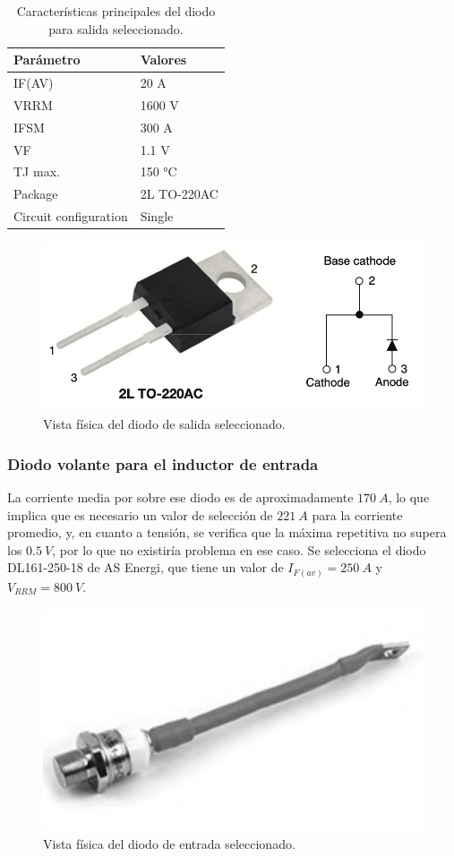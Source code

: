 \begin{table}[h]
	\begin{tabular}{|l|l|}
		\hline
		\textbf{Parámetro} & \textbf{Valores} \\
		\hline
		IF(AV) & 20 A \\
		\hline
		VRRM & 1600 V \\
		\hline
		IFSM  & 300 A \\
		\hline
		VF & 1.1 V \\
		\hline
		TJ max. & 150 °C \\
		\hline
		Package & 2L TO-220AC \\
		\hline
		Circuit configuration & Single \\
		\hline
	\end{tabular}
	\caption{Características principales del diodo para salida seleccionado.}
\end{table}

\begin{figure}
	\centering
	\includegraphics[width=0.4\linewidth]{img/diodo_sal}
	\caption{Vista física del diodo de salida seleccionado.}
	\label{fig:diodosalia}
\end{figure}


\subsubsection{Diodo volante para el inductor de entrada}

La corriente media por sobre ese diodo es de aproximadamente $170 \ A$, lo que implica que es necesario un valor de selección de $221 \ A$ para la corriente promedio, y, en cuanto a tensión, se verifica que la máxima repetitiva no supera los $0.5 \ V$, por lo que no existiría problema en ese caso. Se selecciona el diodo DL161-250-18 de AS Energi, que tiene un valor de $I_{F(av)} = 250 \ A$ y $V_{RRM}=800 \ V$.

\begin{figure}
	\centering
	\includegraphics[width=0.4\linewidth]{img/diodo_entrada}
	\caption{Vista física del diodo de entrada seleccionado.}
	\label{fig:diodoentrada}
\end{figure}


